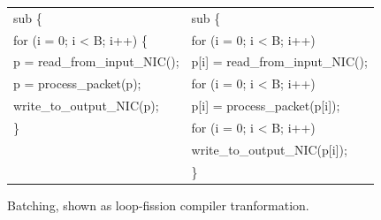 \begin{figure}[ht]
\begin{small}
\begin{tabular}[b]{l|l}
sub\hspace{0.2cm}{\bf app} \{ &  sub\hspace{0.2cm}{\bf app} \{\\
\hspace{0.3cm}for (i = 0; i < B; i++) \{ &\hspace{0.3cm}for (i = 0; i < B; i++)\\
\hspace{0.6cm}p = read\_from\_input\_NIC(); &\hspace{0.6cm}p[i] = read\_from\_input\_NIC();\\
\hspace{0.6cm}p = process\_packet(p); & \hspace{0.3cm}for (i = 0; i < B; i++)\\
\hspace{0.6cm}write\_to\_output\_NIC(p); & \hspace{0.6cm}p[i] = process\_packet(p[i]);\\
\hspace{0.3cm}\} &\hspace{0.3cm}for (i = 0; i < B; i++)\\
&\hspace{0.6cm}write\_to\_output\_NIC(p[i]);\\
&\}\\
\end{tabular}
\end{small}
\caption{\label{fig:loop_fission_batch} Batching, shown as loop-fission compiler tranformation.}
\end{figure}


